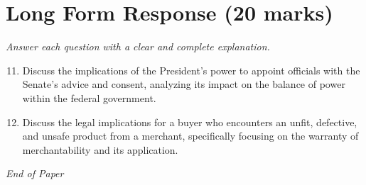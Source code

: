 \documentclass[12pt]{article}
\begin{document}
\section*{Long Form Response (20 marks)}
\textit{Answer each question with a clear and complete explanation.}
\begin{enumerate}[label=\arabic*.]
\setcounter{enumi}{10}
\item Discuss the implications of the President's power to appoint officials with the Senate's advice and consent, analyzing its impact on the balance of power within the federal government.
\item Discuss the legal implications for a buyer who encounters an unfit, defective, and unsafe product from a merchant, specifically focusing on the warranty of merchantability and its application.
\end{enumerate}

\vfill
\noindent\textit{End of Paper}
\end{document}
